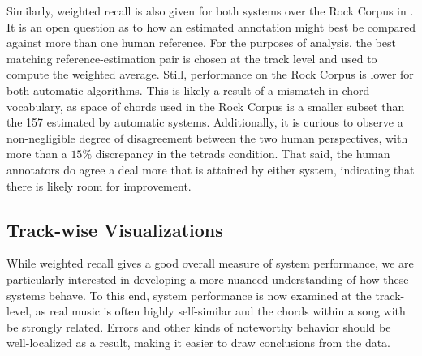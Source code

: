 \documentclass{article}
\begin{document}
Similarly, weighted recall is also given for both systems over the Rock Corpus in .
It is an open question as to how an estimated annotation might best be compared against more than one human reference.
For the purposes of analysis, the best matching reference-estimation pair is chosen at the track level and used to compute the weighted average.
Still, performance on the Rock Corpus is lower for both automatic algorithms.
This is likely a result of a mismatch in chord vocabulary, as space of chords used in the Rock Corpus is a smaller subset than the 157 estimated by automatic systems.
Additionally, it is curious to observe a non-negligible degree of disagreement between the two human perspectives, with more than a $15\%$ discrepancy in the tetrads condition.
That said, the human annotators do agree a deal more that is attained by either system, indicating that there is likely room for improvement.


\subsection{Track-wise Visualizations}

While weighted recall gives a good overall measure of system performance, we are particularly interested in developing a more nuanced understanding of how these systems behave.
To this end, system performance is now examined at the track-level, as real music is often highly self-similar and the chords within a song with be strongly related.
Errors and other kinds of noteworthy behavior should be well-localized as a result, making it easier to draw conclusions from the data.
\end{document}
